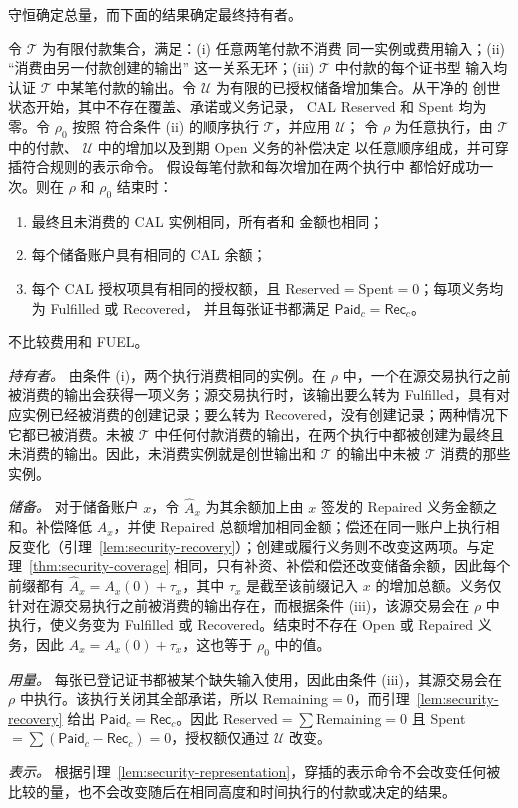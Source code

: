守恒确定总量，而下面的结果确定最终持有者。

\begin{theorem}
\label{thm:security-neutrality}
令 $\mathcal T$ 为有限付款集合，满足：(i) 任意两笔付款不消费
同一实例或费用输入；(ii) ``消费由另一付款创建的输出''
这一关系无环；(iii) $\mathcal T$ 中付款的每个证书型
输入均认证 $\mathcal T$ 中某笔付款的输出。令
$\mathcal U$ 为有限的已授权储备增加集合。从干净的
创世状态开始，其中不存在覆盖、承诺或义务记录，
CAL Reserved 和 Spent 均为零。令 $\rho_0$ 按照
符合条件 (ii) 的顺序执行 $\mathcal T$，并应用 $\mathcal U$；
令 $\rho$ 为任意执行，由 $\mathcal T$ 中的付款、
$\mathcal U$ 中的增加以及到期 Open 义务的补偿决定
以任意顺序组成，并可穿插符合规则的表示命令。
假设每笔付款和每次增加在两个执行中
都恰好成功一次。则在 $\rho$ 和 $\rho_0$ 结束时：
\begin{enumerate}
\item 最终且未消费的 CAL 实例相同，所有者和
金额也相同；
\item 每个储备账户具有相同的 CAL 余额；
\item 每个 CAL 授权项具有相同的授权额，且
Reserved$=$Spent$=0$；每项义务均为 Fulfilled 或 Recovered，
并且每张证书都满足 $\mathsf{Paid}_c=\mathsf{Rec}_c$。
\end{enumerate}
不比较费用和 FUEL。
\end{theorem}
\begin{IEEEproof}
\emph{持有者。} 由条件 (i)，两个执行消费相同的实例。在 $\rho$ 中，一个在源交易执行之前被消费的输出会获得一项义务；源交易执行时，该输出要么转为 Fulfilled，具有对应实例已经被消费的创建记录；要么转为 Recovered，没有创建记录；两种情况下它都已被消费。未被 $\mathcal T$ 中任何付款消费的输出，在两个执行中都被创建为最终且未消费的输出。因此，未消费实例就是创世输出和 $\mathcal T$ 的输出中未被 $\mathcal T$ 消费的那些实例。

\emph{储备。} 对于储备账户 $x$，令 $\hat A_x$ 为其余额加上由 $x$ 签发的 Repaired 义务金额之和。补偿降低 $A_x$，并使 Repaired 总额增加相同金额；偿还在同一账户上执行相反变化（引理~\ref{lem:security-recovery}）；创建或履行义务则不改变这两项。与定理~\ref{thm:security-coverage} 相同，只有补资、补偿和偿还改变储备余额，因此每个前缀都有 $\hat A_x=A_x(0)+\tau_x$，其中 $\tau_x$ 是截至该前缀记入 $x$ 的增加总额。义务仅针对在源交易执行之前被消费的输出存在，而根据条件 (iii)，该源交易会在 $\rho$ 中执行，使义务变为 Fulfilled 或 Recovered。结束时不存在 Open 或 Repaired 义务，因此 $A_x=A_x(0)+\tau_x$，这也等于 $\rho_0$ 中的值。

\emph{用量。} 每张已登记证书都被某个缺失输入使用，因此由条件 (iii)，其源交易会在 $\rho$ 中执行。该执行关闭其全部承诺，所以 Remaining$=0$，而引理~\ref{lem:security-recovery} 给出 $\mathsf{Paid}_c=\mathsf{Rec}_c$。因此 Reserved$=\sum$Remaining$=0$ 且 Spent$=\sum(\mathsf{Paid}_c-\mathsf{Rec}_c)=0$，授权额仅通过 $\mathcal U$ 改变。

\emph{表示。} 根据引理~\ref{lem:security-representation}，穿插的表示命令不会改变任何被比较的量，也不会改变随后在相同高度和时间执行的付款或决定的结果。
\end{IEEEproof}

